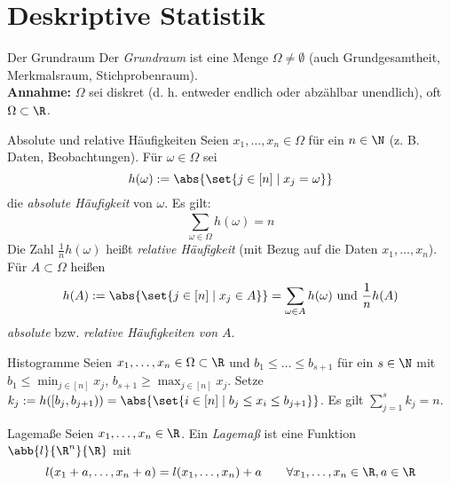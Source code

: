 \section*{Deskriptive Statistik}

\begin{karte}{Der Grundraum}
	Der \textit{Grundraum} ist eine Menge $\Omega \neq \emptyset$ (auch Grundgesamtheit, Merkmalsraum, Stichprobenraum). \\
	\textbf{Annahme:} $\Omega$ sei diskret (d. h. entweder endlich oder abzählbar unendlich), oft $\Omega \subset \R$.
\end{karte}

\begin{karte}{Absolute und relative Häufigkeiten}
	Seien $x_1,\dotsc,x_n \in \Omega$ für ein $n \in \N$ (z. B. Daten, Beobachtungen). Für $\omega \in \Omega$ sei
	$$h(\omega):=\abs{\set{j \in [ n ] \;|\; x_j=\omega }} $$
	die \textit{absolute Häufigkeit} von $\omega$. Es gilt:
	$$\sum_{\omega \in \Omega}^{} h(\omega) = n$$
	Die Zahl $\frac{1}{n}h(\omega)$ heißt \textit{relative Häufigkeit} (mit Bezug auf die Daten $x_1,\dotsc,x_n$). Für $A \subset \Omega$ heißen
	$$h(A):=\abs{\set{j \in [n] \;|\; x_j \in A}} = \sum_{\omega \in A} h(\omega) \text{ und } \frac{1}{n} h(A) $$
	\textit{absolute} bzw. \textit{relative Häufigkeiten von} $A$.
\end{karte}

\begin{karte}{Histogramme}
	Seien $x_1,\dotsc,x_n \in \Omega \subset \R$ und $b_1\le\dotsc\le b_{s+1}$ für ein $s \in \N$ mit $\displaystyle b_1 \leq \min_{j \in [n]} x_j$, $\displaystyle b_{s+1} \ge \max_{j \in [n]} x_j$. Setze $k_j:=h([b_j, b_{j+1})) = \abs{\set{i \in [n] \;|\; b_j \leq x_i \leq b_{j+1}}}$. Es gilt $\displaystyle \sum_{j=1}^{s} k_j = n$.
\end{karte}

\begin{karte}{Lagemaße}
	Seien $x_1,\dotsc,x_n \in \R$. Ein \textit{Lagemaß} ist eine Funktion $\abb{l}{\R^n}{\R}$ mit 
	$$l(x_1+a,\dotsc,x_n+a) = l(x_1,\dotsc,x_n)+a \qquad \forall x_1,\dotsc,x_n \in \R, a \in \R$$
	
\end{karte}

